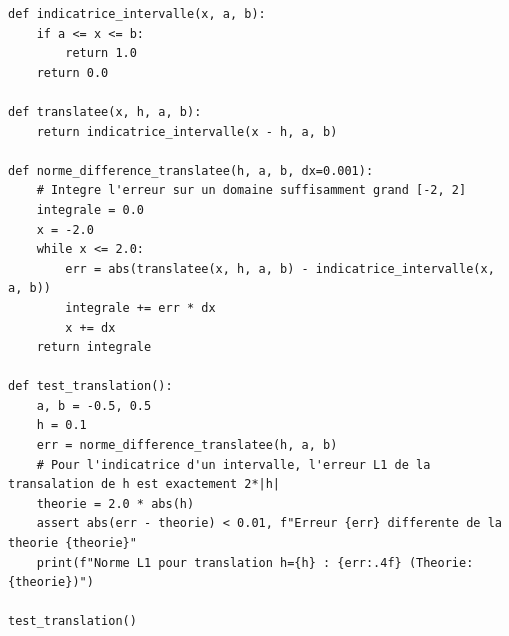 \documentclass[11pt,a4paper]{article}
\begin{document}
\begin{lstlisting}
def indicatrice_intervalle(x, a, b):
    if a <= x <= b:
        return 1.0
    return 0.0

def translatee(x, h, a, b):
    return indicatrice_intervalle(x - h, a, b)

def norme_difference_translatee(h, a, b, dx=0.001):
    # Integre l'erreur sur un domaine suffisamment grand [-2, 2]
    integrale = 0.0
    x = -2.0
    while x <= 2.0:
        err = abs(translatee(x, h, a, b) - indicatrice_intervalle(x, a, b))
        integrale += err * dx
        x += dx
    return integrale

def test_translation():
    a, b = -0.5, 0.5
    h = 0.1
    err = norme_difference_translatee(h, a, b)
    # Pour l'indicatrice d'un intervalle, l'erreur L1 de la transalation de h est exactement 2*|h|
    theorie = 2.0 * abs(h)
    assert abs(err - theorie) < 0.01, f"Erreur {err} differente de la theorie {theorie}"
    print(f"Norme L1 pour translation h={h} : {err:.4f} (Theorie: {theorie})")

test_translation()
\end{lstlisting}
\end{document}
